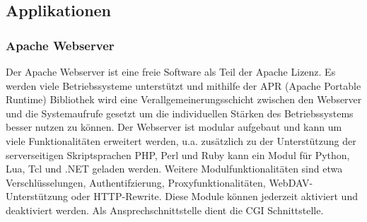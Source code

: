 



\subsection{Applikationen}


\subsubsection{Apache Webserver}
Der Apache Webserver ist eine freie Software als Teil der Apache Lizenz. Es werden viele Betriebssysteme unterstützt und mithilfe der APR (Apache Portable Runtime) Bibliothek wird eine Verallgemeinerungsschicht zwischen den Webserver und die Systemaufrufe gesetzt um die individuellen Stärken des Betriebssystems besser nutzen zu können.
Der Webserver ist modular aufgebaut und kann um viele Funktionalitäten erweitert werden, u.a. zusätzlich zu der Unterstützung der serverseitigen Skriptsprachen PHP, Perl und Ruby kann ein Modul für Python, Lua, Tcl und .NET geladen werden. Weitere Modulfunktionalitäten sind etwa Verschlüsselungen, Authentifzierung, Proxyfunktionalitäten, WebDAV-Unterstützung oder HTTP-Rewrite. Diese Module können jederzeit aktiviert und deaktiviert werden. Als Ansprechschnittstelle dient die CGI Schnittstelle.


